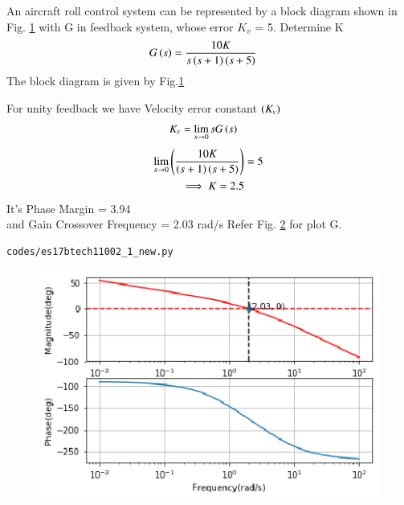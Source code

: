 \item An aircraft roll control system can be represented by a block diagram shown in Fig. \ref{fig:es17btech11002_block} with G in feedback system, whose error  $K_v$ = 5. Determine K 
\begin{align}
G\left(s\right) &= \frac{10K}{s\left(s+1\right)\left(s+5\right)}
\label{eq:es17btech11002_system}
\end{align}
The block diagram is given by Fig.\ref{fig:es17btech11002_block}
\begin{figure}[!ht]
 \centering
     \resizebox{\columnwidth}{!}{}
    \caption{}
    \label{fig:es17btech11002_block}
\end{figure}

For unity feedback we have Velocity error constant $\left(K_v\right)$
\begin{align}
K_v &= \lim_{s \to 0} s G\left(s\right) 
\end{align}
\begin{align}
\lim_{s \to 0} \left(\frac{10K}{\left(s+1\right)\left(s+5\right)} \right)& = 5 \\
\implies K = 2.5
\end{align}
It's Phase Margin  = 3.94\degree\\
and Gain Crossover Frequency = 2.03 rad/s
Refer Fig. \ref{fig:es17btech11002_1} for plot G.
\begin{lstlisting}
codes/es17btech11002_1_new.py
\end{lstlisting}
\begin{figure}[!h]
\centering
  \includegraphics[width=\columnwidth]{./figs/es17btech11002_1_new.eps}
  \caption{}
  \label{fig:es17btech11002_1}
\end{figure}

